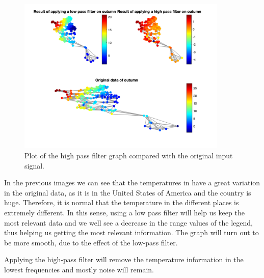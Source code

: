 \documentclass[12pt]{article}
\begin{document}
\begin{figure}[H]
	\centering
	\includegraphics[width=10cm]{images/10.png}
	\caption{Plot of the high pass filter graph compared with the original input signal.}
	\label{fig:lowpassfilterrandom}
\end{figure}
In the previous images we can see that the temperatures in have a great variation in the original data, as it is in the United States of America and the country is huge. Therefore, it is normal that the temperature in the different places is extremely different. In this sense, using a low pass filter will help us keep the most relevant data and we well see a decrease in the range values of the legend, thus helping us getting the most relevant information. The graph will turn out to be more smooth, due to the effect of the low-pass filter.

Applying the high-pass filter will remove the temperature information in the lowest frequencies and mostly noise will remain.
\end{document}
